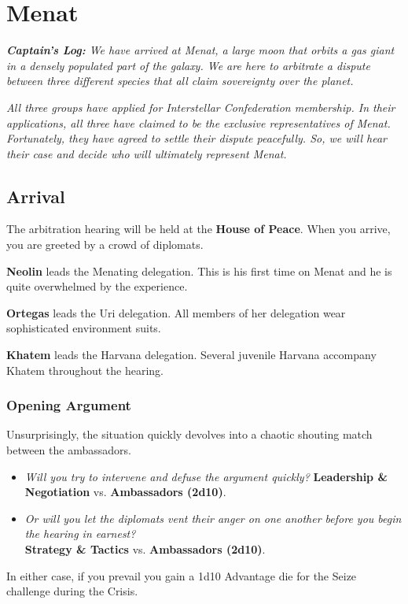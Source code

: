 \documentclass[11pt, a5paper, parskip=half-, DIV=12]{scrartcl}
\begin{document}
\section*{Menat}
\textit{\textbf{Captain's Log:} We have arrived at Menat,
a large moon that orbits a gas giant in a densely populated part of the galaxy.  
We are here to arbitrate a dispute between three different species that all claim sovereignty over the planet.}

\textit{All three groups have applied for Interstellar Confederation membership. In their applications, all three have claimed to be the exclusive representatives of Menat. Fortunately, they have agreed to settle their dispute peacefully. So, we will hear their case and decide who will ultimately represent Menat.}

\subsection*{Arrival}
The arbitration hearing will be held at the \textbf{House of Peace}. When you arrive, you are greeted by a crowd of diplomats.  

\textbf{Neolin} leads the Menating delegation. This is his first time on Menat and he is quite overwhelmed by the experience.

\textbf{Ortegas} leads the Uri delegation. All members of her delegation wear sophisticated environment suits. 

\textbf{Khatem} leads the Harvana delegation. Several juvenile Harvana accompany Khatem throughout the hearing.

\subsubsection*{Opening Argument}
Unsurprisingly, the situation quickly devolves into a chaotic shouting match between the ambassadors.
\begin{itemize}
	\item \textit{Will you try to intervene and defuse the argument quickly?} \textbf{Leadership \& Negotiation} vs. \textbf{Ambassadors (2d10)}.
	\item \textit{Or will you let the diplomats vent their anger on one another before you begin the hearing in earnest?} \\ \textbf{Strategy \& Tactics} vs. \textbf{Ambassadors (2d10)}.
\end{itemize}
In either case, if you prevail you gain a 1d10 Advantage die for the Seize challenge during the Crisis.
\newpage
\end{document}
